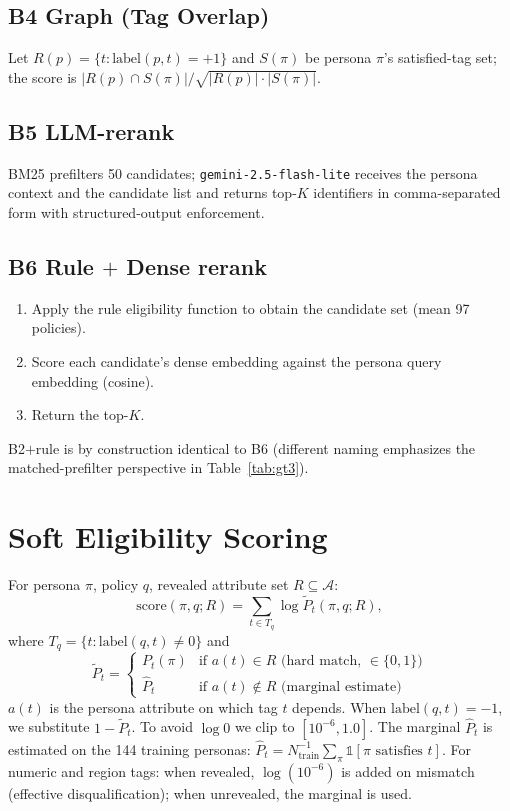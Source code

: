 \documentclass{article}
\begin{document}
\subsection{B4 Graph (Tag Overlap)}
Let $R(p) = \{t : \text{label}(p,t) = +1\}$ and $S(\pi)$ be persona
$\pi$'s satisfied-tag set; the score is
$|R(p)\cap S(\pi)|/\sqrt{|R(p)|\cdot|S(\pi)|}$.

\subsection{B5 LLM-rerank}
BM25 prefilters 50 candidates; \texttt{gemini-2.5-flash-lite}
receives the persona context and the candidate list and returns
top-$K$ identifiers in comma-separated form with structured-output
enforcement.

\subsection{B6 Rule $+$ Dense rerank}
\begin{enumerate}[leftmargin=*,nosep]
\item Apply the rule eligibility function to obtain the candidate
set (mean 97 policies).
\item Score each candidate's dense embedding against the persona
query embedding (cosine).
\item Return the top-$K$.
\end{enumerate}
B2$+$rule is by construction identical to B6 (different naming
emphasizes the matched-prefilter perspective in
Table~\ref{tab:gt3}).

\section{Soft Eligibility Scoring}
\label{app:soft_elig}

For persona $\pi$, policy $q$, revealed attribute set
$R \subseteq \mathcal{A}$:
\[
\mathrm{score}(\pi, q; R) = \sum_{t \in T_q} \log \tilde{P}_t(\pi, q; R),
\]
where $T_q = \{t : \text{label}(q,t) \neq 0\}$ and
\[
\tilde{P}_t = \begin{cases}
P_t(\pi) & \text{if } a(t) \in R \text{ (hard match, } \in\{0,1\}) \\
\hat{P}_t & \text{if } a(t) \notin R \text{ (marginal estimate)}
\end{cases}
\]
$a(t)$ is the persona attribute on which tag $t$ depends. When
$\text{label}(q,t)=-1$, we substitute $1-\tilde{P}_t$. To avoid
$\log 0$ we clip to $[10^{-6}, 1.0]$. The marginal $\hat{P}_t$ is
estimated on the 144 training personas:
$\hat{P}_t = N_{\text{train}}^{-1} \sum_{\pi}
\mathbb{1}[\pi \text{ satisfies } t]$.
For numeric and region tags: when revealed, $\log(10^{-6})$ is
added on mismatch (effective disqualification); when unrevealed,
the marginal is used.
\end{document}
